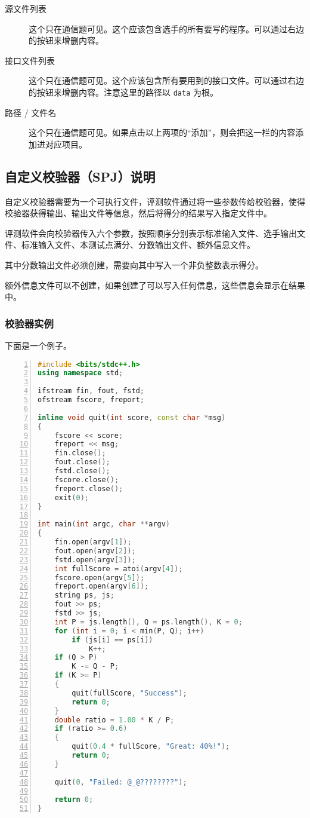 \documentclass[UTF-8]{ctexart}
\begin{document}
\begin{description}
        \item[源文件列表] 这个只在通信题可见。这个应该包含选手的所有要写的程序。可以通过右边的按钮来增删内容。
        \item[接口文件列表] 这个只在通信题可见。这个应该包含所有要用到的接口文件。可以通过右边的按钮来增删内容。注意这里的路径以 \texttt{data} 为根。
        \item[路径 / 文件名] 这个只在通信题可见。如果点击以上两项的“添加”，则会把这一栏的内容添加进对应项目。
    \end{description}


    \subsection{自定义校验器（SPJ）说明}

    自定义校验器需要为一个可执行文件，评测软件通过将一些参数传给校验器，使得校验器获得输出、输出文件等信息，然后将得分的结果写入指定文件中。

    评测软件会向校验器传入六个参数，按照顺序分别表示标准输入文件、选手输出文件、标准输入文件、本测试点满分、分数输出文件、额外信息文件。

    其中分数输出文件必须创建，需要向其中写入一个非负整数表示得分。

    额外信息文件可以不创建，如果创建了可以写入任何信息，这些信息会显示在结果中。

    \subsubsection{校验器实例}

    下面是一个例子。

    \begin{lstlisting}[language={C++},numbers=left,showspaces=false,showstringspaces=false,frame=shadowbox,basicstyle=\ttfamily]
#include <bits/stdc++.h>
using namespace std;

ifstream fin, fout, fstd;
ofstream fscore, freport;

inline void quit(int score, const char *msg)
{
	fscore << score;
	freport << msg;
	fin.close();
	fout.close();
	fstd.close();
	fscore.close();
	freport.close();
	exit(0);
}

int main(int argc, char **argv)
{
	fin.open(argv[1]);
	fout.open(argv[2]);
	fstd.open(argv[3]);
	int fullScore = atoi(argv[4]);
	fscore.open(argv[5]);
	freport.open(argv[6]);
	string ps, js;
	fout >> ps;
	fstd >> js;
	int P = js.length(), Q = ps.length(), K = 0;
	for (int i = 0; i < min(P, Q); i++)
		if (js[i] == ps[i])
			K++;
	if (Q > P)
		K -= Q - P;
	if (K >= P)
	{
		quit(fullScore, "Success");
		return 0;
	}
	double ratio = 1.00 * K / P;
	if (ratio >= 0.6)
	{
		quit(0.4 * fullScore, "Great: 40%!");
		return 0;
	}

	quit(0, "Failed: @_@????????");

	return 0;
}
    \end{lstlisting}
\end{document}
